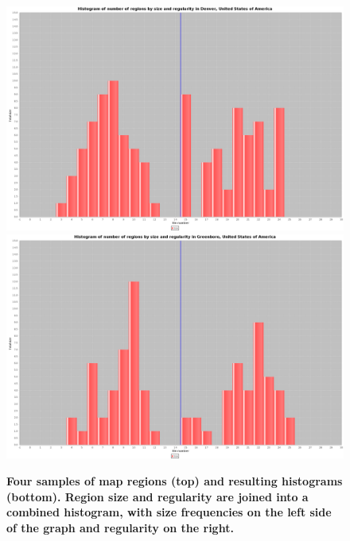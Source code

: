 \documentclass[final,3p,times,authoryear]{elsarticle}
\begin{document}
\begin{figure}[!htbp]
\includegraphics[scale=0.06]{Images/Combinedcity169-59949.png}
\includegraphics[scale=0.06]{Images/Combinedcity1521-754459.png}
\caption{\bf Four samples of map regions (top) and resulting histograms (bottom). Region size and regularity are joined into a combined histogram, with size frequencies on the left side of the graph and regularity on the right.}    
 \label{fig:mapsandHist}  
\end{figure} 
\end{document}
